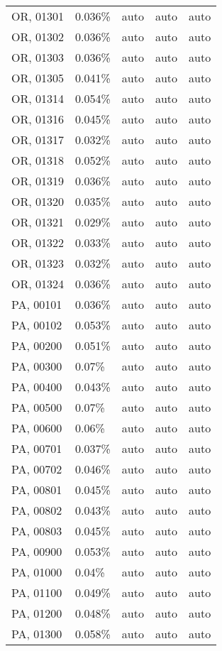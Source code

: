 \begin{longtable}[]{@{}lllll@{}}
OR, 01301 & 0.036\% & auto & auto & auto \\
OR, 01302 & 0.036\% & auto & auto & auto \\
OR, 01303 & 0.036\% & auto & auto & auto \\
OR, 01305 & 0.041\% & auto & auto & auto \\
OR, 01314 & 0.054\% & auto & auto & auto \\
OR, 01316 & 0.045\% & auto & auto & auto \\
OR, 01317 & 0.032\% & auto & auto & auto \\
OR, 01318 & 0.052\% & auto & auto & auto \\
OR, 01319 & 0.036\% & auto & auto & auto \\
OR, 01320 & 0.035\% & auto & auto & auto \\
OR, 01321 & 0.029\% & auto & auto & auto \\
OR, 01322 & 0.033\% & auto & auto & auto \\
OR, 01323 & 0.032\% & auto & auto & auto \\
OR, 01324 & 0.036\% & auto & auto & auto \\
PA, 00101 & 0.036\% & auto & auto & auto \\
PA, 00102 & 0.053\% & auto & auto & auto \\
PA, 00200 & 0.051\% & auto & auto & auto \\
PA, 00300 & 0.07\% & auto & auto & auto \\
PA, 00400 & 0.043\% & auto & auto & auto \\
PA, 00500 & 0.07\% & auto & auto & auto \\
PA, 00600 & 0.06\% & auto & auto & auto \\
PA, 00701 & 0.037\% & auto & auto & auto \\
PA, 00702 & 0.046\% & auto & auto & auto \\
PA, 00801 & 0.045\% & auto & auto & auto \\
PA, 00802 & 0.043\% & auto & auto & auto \\
PA, 00803 & 0.045\% & auto & auto & auto \\
PA, 00900 & 0.053\% & auto & auto & auto \\
PA, 01000 & 0.04\% & auto & auto & auto \\
PA, 01100 & 0.049\% & auto & auto & auto \\
PA, 01200 & 0.048\% & auto & auto & auto \\
PA, 01300 & 0.058\% & auto & auto & auto \\

\end{longtable}
